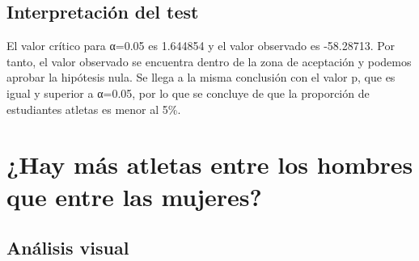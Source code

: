 \documentclass[
]{article}
\newenvironment{Shaded}{\begin{snugshade}}{\end{snugshade}}
\newcommand{\AttributeTok}[1]{\textcolor[rgb]{0.80,0.80,0.80}{#1}}
\newcommand{\ConstantTok}[1]{\textcolor[rgb]{0.86,0.64,0.64}{\textbf{#1}}}
\newcommand{\DecValTok}[1]{\textcolor[rgb]{0.86,0.86,0.80}{#1}}
\newcommand{\FunctionTok}[1]{\textcolor[rgb]{0.94,0.94,0.56}{#1}}
\newcommand{\NormalTok}[1]{\textcolor[rgb]{0.80,0.80,0.80}{#1}}
\newcommand{\OtherTok}[1]{\textcolor[rgb]{0.94,0.94,0.56}{#1}}
\newcommand{\SpecialCharTok}[1]{\textcolor[rgb]{0.86,0.64,0.64}{#1}}
\newcommand{\StringTok}[1]{\textcolor[rgb]{0.80,0.58,0.58}{#1}}
\begin{document}
\hypertarget{interpretaciuxf3n-del-test-2}{%
\subsection{Interpretación del
test}\label{interpretaciuxf3n-del-test-2}}

El valor crítico para α=0.05 es 1.644854 y el valor observado es
-58.28713. Por tanto, el valor observado se encuentra dentro de la zona
de aceptación y podemos aprobar la hipótesis nula. Se llega a la misma
conclusión con el valor p, que es igual y superior a α=0.05, por lo que
se concluye de que la proporción de estudiantes atletas es menor al 5\%.

\hypertarget{hay-muxe1s-atletas-entre-los-hombres-que-entre-las-mujeres}{%
\section{¿Hay más atletas entre los hombres que entre las
mujeres?}\label{hay-muxe1s-atletas-entre-los-hombres-que-entre-las-mujeres}}

\hypertarget{anuxe1lisis-visual-4}{%
\subsection{Análisis visual}\label{anuxe1lisis-visual-4}}

\begin{Shaded}
\end{Shaded}
\end{document}
